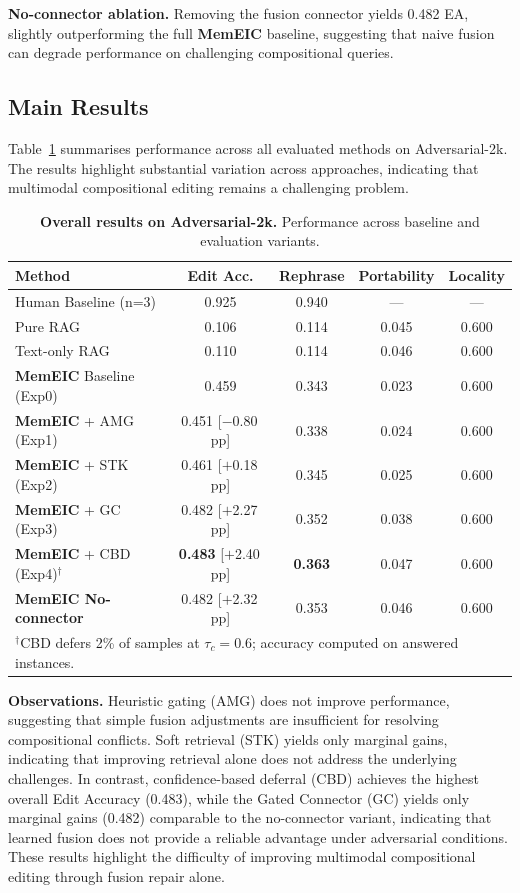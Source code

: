 \documentclass{article}
\newcommand{\memeic}{\textbf{MemEIC}}
\begin{document}
\textbf{No-connector ablation.} Removing the fusion connector yields 0.482 EA, slightly outperforming the full \memeic{} baseline, suggesting that naive fusion can degrade performance on challenging compositional queries.


\subsection{Main Results}
\label{sec:main_results}

Table~\ref{tab:adv2k_main} summarises performance across all evaluated methods on Adversarial-2k. The results highlight substantial variation across approaches, indicating that multimodal compositional editing remains a challenging problem.

\begin{table}[h]
\centering
\caption{\textbf{Overall results on Adversarial-2k.} Performance across baseline and evaluation variants.}
\label{tab:adv2k_main}
\small
\begin{tabular}{@{}lcccc@{}}
\toprule
\textbf{Method} & \textbf{Edit Acc.} & \textbf{Rephrase} & \textbf{Portability} & \textbf{Locality} \\
\midrule
Human Baseline (n=3)        & 0.925 & 0.940 & --- & --- \\
\midrule
Pure RAG                    & 0.106 & 0.114 & 0.045 & 0.600 \\
Text-only RAG               & 0.110 & 0.114 & 0.046 & 0.600 \\
\midrule
\memeic{} Baseline (Exp0)   & 0.459 & 0.343 & 0.023 & 0.600 \\
\memeic{} + AMG (Exp1)      & 0.451 [$-$0.80\,pp] & 0.338 & 0.024 & 0.600 \\
\memeic{} + STK (Exp2)      & 0.461 [$+$0.18\,pp] & 0.345 & 0.025 & 0.600 \\
\memeic{} + GC (Exp3)       & 0.482 [$+$2.27\,pp] & 0.352 & 0.038 & 0.600 \\
\memeic{} + CBD (Exp4)$^\dagger$ & \textbf{0.483} [$+$2.40\,pp] & \textbf{0.363} & 0.047 & 0.600 \\
\textbf{\memeic{} No-connector} & 0.482 [$+$2.32\,pp] & 0.353 & 0.046 & 0.600 \\
\bottomrule
\multicolumn{5}{l}{\small $^\dagger$CBD defers 2\% of samples at $\tau_c=0.6$; accuracy computed on answered instances.}
\end{tabular}
\end{table}

\textbf{Observations.}
Heuristic gating (AMG) does not improve performance, suggesting that simple fusion adjustments are insufficient for resolving compositional conflicts. Soft retrieval (STK) yields only marginal gains, indicating that improving retrieval alone does not address the underlying challenges. In contrast, confidence-based deferral (CBD) achieves the highest overall Edit Accuracy (0.483), while the Gated Connector (GC) yields only marginal gains (0.482) comparable to the no-connector variant, indicating that learned fusion does not provide a reliable advantage under adversarial conditions. These results highlight the difficulty of improving multimodal compositional editing through fusion repair alone.
\end{document}
